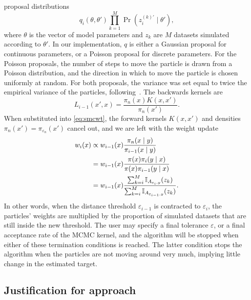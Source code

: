 proposal distributions
\[
  q_i(\theta, \theta') \prod_{k=1}^M \Pr(z_i^{(k)'} \mid \theta'),
\]
where $\theta$ is the vector of model parameters and $z_k$ are $M$ datasets
simulated according to $\theta'$. In our implementation, $q$ is either a
Gaussian proposal for continuous parameters, or a Poisson proposal for discrete
parameters. For the Poisson proposals, the number of steps to move the particle
is drawn from a Poisson distribution, and the direction in which to move the
particle is chosen uniformly at random. For both proposals, the variance was
set equal to twice the empirical variance of the particles,
following~\autocite{beaumont2009adaptive, del2012adaptive}. The backwards
kernels are
\[
  L_{i-1}(x', x) = \frac{\pi_n(x)K(x, x')}{\pi_n(x')}.
\]
When substituted into \cref{eq:smcwt}, the forward kernels $K(x, x')$ and
densities $\pi_n(x') = \pi_{\varepsilon_n}(x')$ cancel out, and we are left
with the weight update 
\begin{align*}
  w_i(x) 
    &\propto w_{i-1}(x) \frac{\pi_n(x \mid y)}{\pi_{i-1}(x \mid y)} \\
    &= w_{i-1}(x) \frac{\pi(x) \pi_i(y \mid x)}{\pi(x) \pi_{i-1}(y \mid x)} \\
    &= w_{i-1}(x) \frac{\sum_{k=i}^M \mathbb{I}_{A_{\varepsilon_i, y}}(z_k)}
            {\sum_{k=i}^M \mathbb{I}_{A_{\varepsilon_{i-1}, y}}(z_k)}.
\end{align*}
In other words, when the distance threshold $\varepsilon_{i-1}$ is contracted
to $\varepsilon_i$, the particles' weights are multiplied by the proportion of
simulated datasets that are still inside the new threshold. 
The user may specify a final tolerance $\varepsilon$, or a final acceptance
rate of the \gls{MCMC} kernel, and the algorithm will be stopped when either of
these termination conditions is reached. The latter condition stops the
algorithm when the particles are not moving around very much, implying little
change in the estimated target.

\subsection{Justification for approach}
\label{subsec:just}

